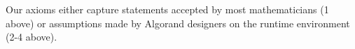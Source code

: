 Our axioms either capture statements accepted by most mathematicians (1 above) or assumptions made by Algorand designers on the runtime environment (2-4 above).

%
%
%
%
